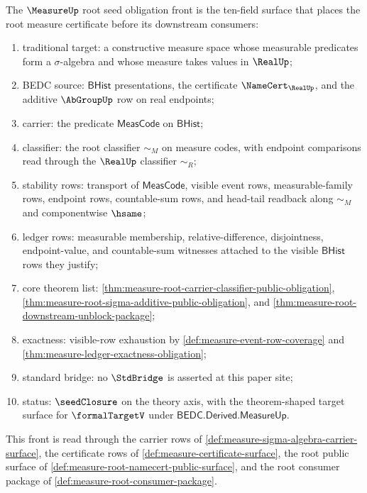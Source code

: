 \begin{definition}
\label{def:measure-root-seed-obligation-front}
The $\MeasureUp$ root seed obligation front is the ten-field surface that
places the root measure certificate before its downstream consumers:
\begin{enumerate}
  \item traditional target: a constructive measure space whose measurable
  predicates form a $\sigma$-algebra and whose measure takes values in
  $\RealUp$;
  \item BEDC source: $\mathsf{BHist}$ presentations, the certificate
  $\NameCert_{\RealUp}$, and the additive $\AbGroupUp$ row on real endpoints;
  \item carrier: the predicate $\mathsf{MeasCode}$ on $\mathsf{BHist}$;
  \item classifier: the root classifier $\sim_M$ on measure codes, with
  endpoint comparisons read through the $\RealUp$ classifier $\sim_R$;
  \item stability rows: transport of $\mathsf{MeasCode}$, visible event
  rows, measurable-family rows, endpoint rows, countable-sum rows, and
  head-tail readback along $\sim_M$ and componentwise $\hsame$;
  \item ledger rows: measurable membership, relative-difference,
  disjointness, endpoint-value, and countable-sum witnesses attached to the
  visible $\mathsf{BHist}$ rows they justify;
  \item core theorem list:
  \autoref{thm:measure-root-carrier-classifier-public-obligation},
  \autoref{thm:measure-root-sigma-additive-public-obligation}, and
  \autoref{thm:measure-root-downstream-unblock-package};
  \item exactness: visible-row exhaustion by
  \autoref{def:measure-event-row-coverage} and
  \autoref{thm:measure-ledger-exactness-obligation};
  \item standard bridge: no $\StdBridge$ is asserted at this paper site;
  \item status: $\seedClosure$ on the theory axis, with the theorem-shaped
  target surface for $\formalTargetV$ under $\mathsf{BEDC.Derived.MeasureUp}$.
\end{enumerate}
This front is read through the carrier rows of
\autoref{def:measure-sigma-algebra-carrier-surface}, the certificate rows of
\autoref{def:measure-certificate-surface}, the root public surface of
\autoref{def:measure-root-namecert-public-surface}, and the root consumer
package of \autoref{def:measure-root-consumer-package}.
\end{definition}

